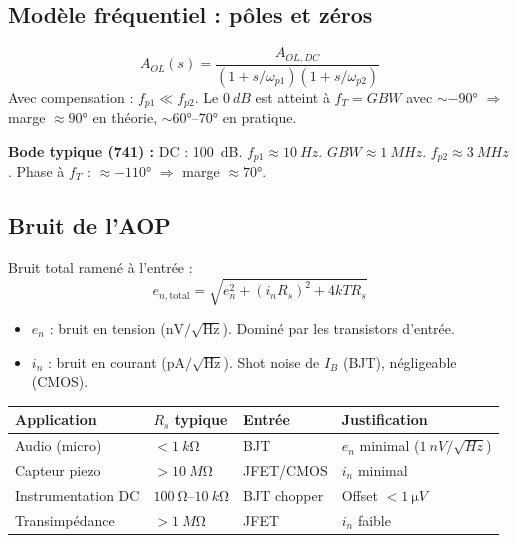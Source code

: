 \documentclass[12pt,a4paper,twoside]{book}
\begin{document}
\subsection{Modèle fréquentiel : pôles et zéros}

\begin{formule}
\[
A_{OL}(s) = \frac{A_{OL,DC}}{(1+s/\omega_{p1})(1+s/\omega_{p2})}
\]
Avec compensation : $f_{p1} \ll f_{p2}$. Le $\SI{0}{dB}$ est atteint à $f_T = GBW$ avec $\sim -90°$ $\Rightarrow$ marge $\approx 90°$ en théorie, $\sim 60°$--$70°$ en pratique.
\end{formule}

\begin{pratique}
\textbf{Bode typique (741) :} DC : \SI{100}{dB}. $f_{p1} \approx \SI{10}{Hz}$. $GBW \approx \SI{1}{MHz}$. $f_{p2} \approx \SI{3}{MHz}$. Phase à $f_T$ : $\approx -110°$ $\Rightarrow$ marge $\approx 70°$.
\end{pratique}

\subsection{Bruit de l'AOP}

\begin{formule}
Bruit total ramené à l'entrée :
\[
\boxed{e_{n,\text{total}} = \sqrt{e_n^2 + (i_n R_s)^2 + 4kTR_s}}
\]
\begin{itemize}[nosep]
\item $e_n$ : bruit en tension ($\text{nV}/\sqrt{\text{Hz}}$). Dominé par les transistors d'entrée.
\item $i_n$ : bruit en courant ($\text{pA}/\sqrt{\text{Hz}}$). Shot noise de $I_B$ (BJT), négligeable (CMOS).
\end{itemize}
\end{formule}

\begin{pratique}
\begin{center}
\renewcommand{\arraystretch}{1.4}
\begin{tabular}{p{2.5cm}p{2.5cm}p{2cm}p{5cm}}
\toprule
\textbf{Application} & \textbf{$R_s$ typique} & \textbf{Entrée} & \textbf{Justification} \\
\midrule
Audio (micro) & $< \SI{1}{k\ohm}$ & BJT & $e_n$ minimal ($\SI{1}{nV/\sqrt{Hz}}$) \\
Capteur piezo & $> \SI{10}{M\ohm}$ & JFET/CMOS & $i_n$ minimal \\
Instrumentation DC & $\SI{100}{\ohm}$--$\SI{10}{k\ohm}$ & BJT chopper & Offset $< \SI{1}{\micro V}$ \\
Transimpédance & $> \SI{1}{M\ohm}$ & JFET & $i_n$ faible \\
\bottomrule
\end{tabular}
\end{center}
\end{pratique}
\end{document}
